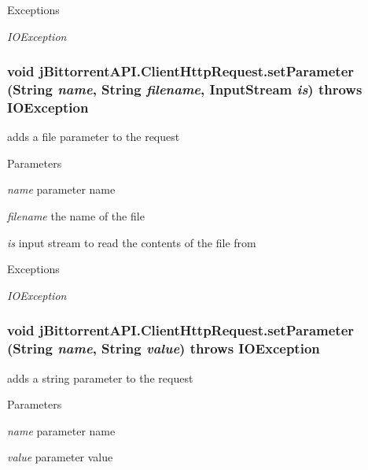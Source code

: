 \begin{DoxyExceptions}{Exceptions}
\item[{\em IOException}]\end{DoxyExceptions}
\hypertarget{classj_bittorrent_a_p_i_1_1_client_http_request_a97bf22e0a4053bc52e33e38b8e616830}{
\subsubsection[{setParameter}]{\setlength{\rightskip}{0pt plus 5cm}void jBittorrentAPI.ClientHttpRequest.setParameter (String {\em name}, \/  String {\em filename}, \/  InputStream {\em is})  throws IOException }}
\label{classj_bittorrent_a_p_i_1_1_client_http_request_a97bf22e0a4053bc52e33e38b8e616830}
adds a file parameter to the request 
\begin{DoxyParams}{Parameters}
\item[{\em name}]parameter name \item[{\em filename}]the name of the file \item[{\em is}]input stream to read the contents of the file from \end{DoxyParams}

\begin{DoxyExceptions}{Exceptions}
\item[{\em IOException}]\end{DoxyExceptions}
\hypertarget{classj_bittorrent_a_p_i_1_1_client_http_request_a93410ed6c53910e5d106ec450c637865}{
\subsubsection[{setParameter}]{\setlength{\rightskip}{0pt plus 5cm}void jBittorrentAPI.ClientHttpRequest.setParameter (String {\em name}, \/  String {\em value})  throws IOException }}
\label{classj_bittorrent_a_p_i_1_1_client_http_request_a93410ed6c53910e5d106ec450c637865}
adds a string parameter to the request 
\begin{DoxyParams}{Parameters}
\item[{\em name}]parameter name \item[{\em value}]parameter value \end{DoxyParams}

